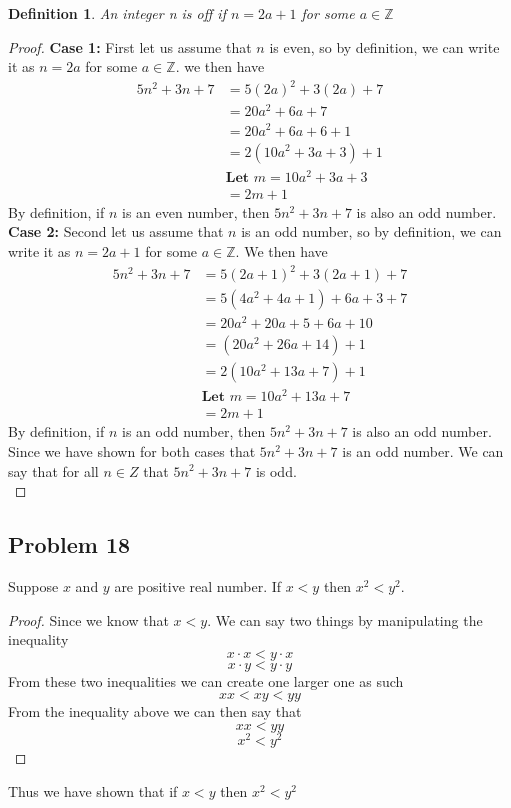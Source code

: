 \documentclass[12pt]{article}
\newtheorem{definition}{Definition}
\newcommand{\Z}{\mathbb{Z}}
\begin{document}
\begin{definition}
An integer n is off if $n = 2a + 1$ for some $a \in \Z$
\end{definition}
\begin{proof}

\textbf{Case 1:} First let us assume that $n$ is even, so by definition, we can write it as $n = 2a$ for some $a \in \Z$. we then have
\begin{align*}
5n^2 + 3n + 7 &= 5(2a)^2 + 3(2a) + 7\\
&= 20a^2 + 6a + 7\\
&= 20a^2 + 6a + 6 + 1\\
&= 2(10a^2 + 3a + 3) + 1\\
&\textbf{Let } m = 10a^2 + 3a + 3\\
&= 2m + 1
\end{align*}
By definition, if $n$ is an even number, then $5n^2 + 3n + 7$ is also an odd number.\\
\textbf{Case 2:} Second let us assume that $n$ is an odd number, so by definition, we can write it as $n = 2a + 1$ for some $a \in \Z$. We then have
\begin{align*}
5n^2 + 3n + 7 &= 5(2a + 1)^2 + 3(2a + 1) + 7\\
&= 5(4a^2 + 4a + 1) + 6a + 3 + 7\\
&= 20a^2 + 20a + 5 + 6a + 10\\
&= (20a^2 + 26a + 14) + 1\\
&= 2(10a^2 + 13a + 7) + 1\\
& \textbf{Let } m = 10a^2 + 13a + 7\\
&= 2m + 1
\end{align*}
By definition, if $n$ is an odd number, then $5n^2 + 3n + 7$ is also an odd number.\\

Since we have shown for both cases that $5n^2 + 3n + 7$ is an odd number. We can say that for all $n \in Z$ that $5n^2 + 3n + 7$ is odd.\\
\end{proof}



\subsection*{Problem 18}
Suppose $x$ and $y$ are positive real number. If $x < y$ then $x^2 < y^2$. 
\begin{proof}
Since we know that $x < y$. We can say two things by manipulating the inequality
\[ x \cdot x < y \cdot x \]
\[ x \cdot y < y \cdot y \]
From these  two inequalities we can create one larger one as such
\[ xx < xy < yy \]
From the inequality above we can then say that 
\[ xx < yy \]
\[ x^2 < y^2 \]
\end{proof}
Thus we have shown that if $x < y$ then $x^2 < y^2$
\end{document}
